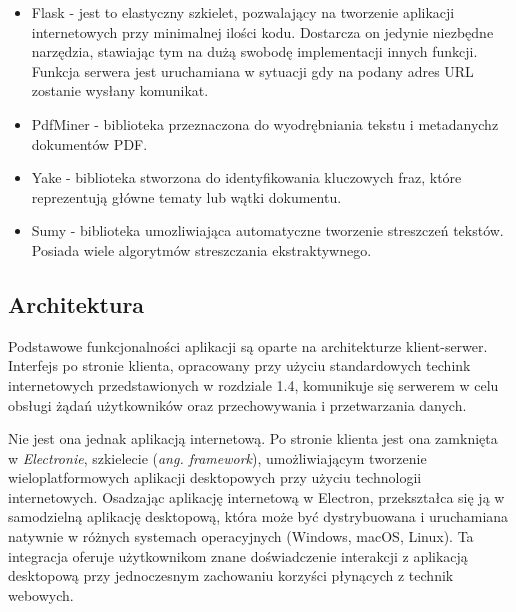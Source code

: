 \documentclass[12pt,a4paper,twoside]{article}
\begin{document}
\begin{itemize}
	\item Flask - jest to elastyczny szkielet, pozwalający na tworzenie aplikacji internetowych przy minimalnej ilości kodu. Dostarcza on jedynie niezbędne narzędzia, stawiając tym na dużą swobodę implementacji innych funkcji. Funkcja serwera jest uruchamiana w sytuacji gdy na podany adres URL zostanie wysłany komunikat.
	\item PdfMiner - biblioteka przeznaczona do wyodrębniania tekstu i metadanych\break z dokumentów PDF. 
	\item Yake - biblioteka stworzona do identyfikowania kluczowych fraz, które reprezentują główne tematy lub wątki dokumentu.
	\item Sumy - biblioteka umozliwiająca automatyczne tworzenie streszczeń tekstów. Posiada wiele algorytmów streszczania ekstraktywnego.
\end{itemize}
\subsection{Architektura}
Podstawowe funkcjonalności aplikacji są oparte na architekturze klient-serwer. Interfejs po stronie klienta, opracowany przy użyciu standardowych techink internetowych przedstawionych w rozdziale 1.4, komunikuje się serwerem w celu obsługi żądań użytkowników oraz przechowywania i przetwarzania danych.\par
Nie jest ona jednak aplikacją internetową. Po stronie klienta jest ona zamknięta w \textit{Electronie}, szkielecie (\textit{ang. framework}), umożliwiającym tworzenie wieloplatformowych aplikacji desktopowych przy użyciu technologii internetowych. Osadzając aplikację internetową w Electron, przekształca się ją w samodzielną aplikację desktopową, która może być dystrybuowana i uruchamiana natywnie w różnych systemach operacyjnych (Windows, macOS, Linux). Ta integracja oferuje użytkownikom znane doświadczenie interakcji z aplikacją desktopową przy jednoczesnym zachowaniu korzyści płynących z technik webowych.
\end{document}
